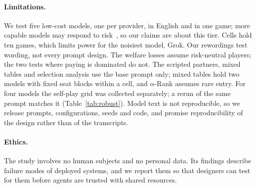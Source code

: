\paragraph{Limitations.}
We test five low-cost models, one per provider, in English and in one game; more capable
models may respond to risk~\cite{anon-if}, so our claims are about this tier. Cells hold ten
games, which limits power for the noisiest model, Grok. Our rewordings test wording, not
every prompt design. The welfare losses assume risk-neutral players; the two tests where
paying is dominated do not. The scripted partners, mixed tables and selection analysis use the
base prompt only; mixed tables hold two models with fixed seat blocks within a cell, and
$\alpha$-Rank assumes rare entry. For four models the self-play grid was collected separately;
a rerun of the same prompt matches it (Table~\ref{tab:robust}). Model text is not
reproducible, so we release prompts, configurations, seeds and code, and promise
reproducibility of the design rather than of the transcripts.

\paragraph{Ethics.}
The study involves no human subjects and no personal data. Its findings describe failure
modes of deployed systems, and we report them so that designers can test for them before
agents are trusted with shared resources.
